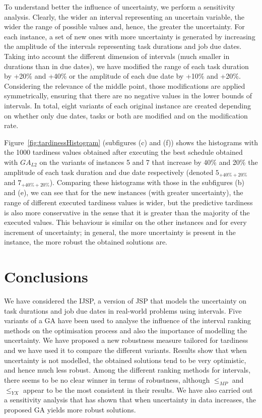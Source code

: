 \documentclass[12pt,halfline,a4paper]{ouparticle}
\begin{document}
To understand better the influence of uncertainty, we perform a sensitivity analysis. Clearly, the wider an interval representing an uncertain variable, the wider the range of possible values and, hence, the greater the uncertainty. For each instance, a set of new ones with more uncertainty is generated by increasing the amplitude of the intervals representing task durations and job due dates. Taking into account the different dimension of intervals (much smaller in durations than in due dates), we have modified the range of each task duration by +20\% and +40\% or the amplitude of each due date by +10\% and +20\%. Considering the relevance of the middle point, those modifications are applied symmetrically, ensuring that there are no negative values in the lower bounds of intervals. In total, eight variants of each original instance are created depending on whether only due dates, tasks or both are modified and on the modification rate.

Figure~\ref{fig:tardinessHistogram} (subfigures (c) and (f)) shows the histograms with the 1000 tardiness values obtained after executing the best schedule obtained with $GA_{L2}$ on the variants of instances 5 and 7 that increase by 40\% and 20\% the amplitude of each task duration and due date respectively (denoted $5_{+40\%+20\%}$ and $7_{+40\%+20\%}$). Comparing these histograms with those in the subfigures (b) and (e), we can see that for the new instances (with greater uncertainty), the range of different executed tardiness values is wider, but the predictive tardiness is also more conservative in the sense that it is greater than the majority of the executed values.
This behaviour is similar on the other instances and for every increment of uncertainty; in general, the more uncertainty is present in the instance, the more robust the obtained solutions are.





\section{Conclusions}

We have considered the IJSP, a version of JSP that models the uncertainty on task durations and job due dates in real-world problems using intervals. Five variants of a GA have been used to analyse the influence of the interval ranking methods on the optimisation process and also the importance of modelling the uncertainty. We have proposed a new robustness measure tailored for tardiness and we have used it to compare the different variants. Results show that when uncertainty is not modelled, the obtained solutions tend to be very optimistic, and hence much less robust. Among the different ranking methods for intervals, there seems to be no clear winner in terms of robustness, although $\leq_{MP}$ and $\leq_{YX}$ appear to be the most consistent in their results. We have also carried out a sensitivity analysis that has shown that when uncertainty in data increases, the proposed GA yields more robust solutions.
\end{document}
